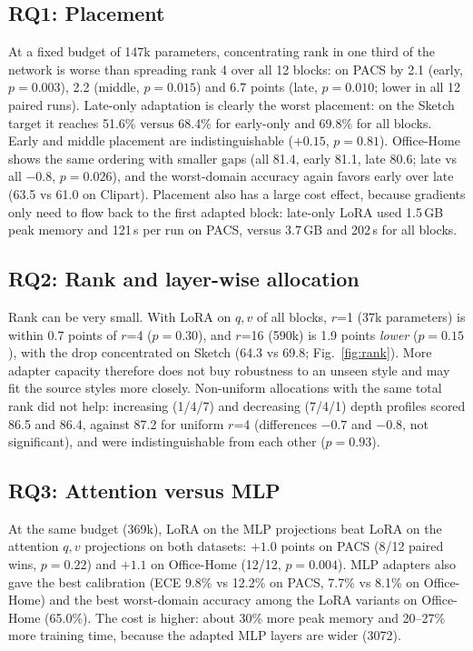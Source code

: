 \documentclass[10pt,twocolumn]{article}
\begin{document}
\subsection{RQ1: Placement}
At a fixed budget of 147k parameters, concentrating rank in one third of the network is worse than spreading rank 4
over all 12 blocks: on PACS by 2.1 (early, $p=0.003$), 2.2 (middle, $p=0.015$) and 6.7 points (late, $p=0.010$;
lower in all 12 paired runs). Late-only adaptation is clearly the worst placement: on the Sketch target it reaches
51.6\% versus 68.4\% for early-only and 69.8\% for all blocks. Early and middle placement are indistinguishable
($+0.15$, $p=0.81$). Office-Home shows the same ordering with smaller gaps (all 81.4, early 81.1, late 80.6; late vs
all $-0.8$, $p=0.026$), and the worst-domain accuracy again favors early over late (63.5 vs 61.0 on Clipart).
Placement also has a large cost effect, because gradients only need to flow back to the first adapted block:
late-only LoRA used 1.5\,GB peak memory and 121\,s per run on PACS, versus 3.7\,GB and 202\,s for all blocks.

\subsection{RQ2: Rank and layer-wise allocation}
Rank can be very small. With LoRA on $q,v$ of all blocks, $r$=1 (37k parameters) is within 0.7 points of $r$=4
($p=0.30$), and $r$=16 (590k) is 1.9 points \emph{lower} ($p=0.15$), with the drop concentrated on Sketch (64.3 vs
69.8; Fig.~\ref{fig:rank}). More adapter capacity therefore does not buy robustness to an unseen style and may fit
the source styles more closely. Non-uniform allocations with the same total rank did not help: increasing
(1/4/7) and decreasing (7/4/1) depth profiles scored 86.5 and 86.4, against 87.2 for uniform $r$=4 (differences
$-0.7$ and $-0.8$, not significant), and were indistinguishable from each other ($p=0.93$).

\subsection{RQ3: Attention versus MLP}
At the same budget (369k), LoRA on the MLP projections beat LoRA on the attention $q,v$ projections on both
datasets: $+1.0$ points on PACS (8/12 paired wins, $p=0.22$) and $+1.1$ on Office-Home (12/12, $p=0.004$). MLP
adapters also gave the best calibration (ECE 9.8\% vs 12.2\% on PACS, 7.7\% vs 8.1\% on Office-Home) and the best
worst-domain accuracy among the LoRA variants on Office-Home (65.0\%). The cost is higher: about 30\% more peak
memory and 20--27\% more training time, because the adapted MLP layers are wider (3072).
\end{document}
